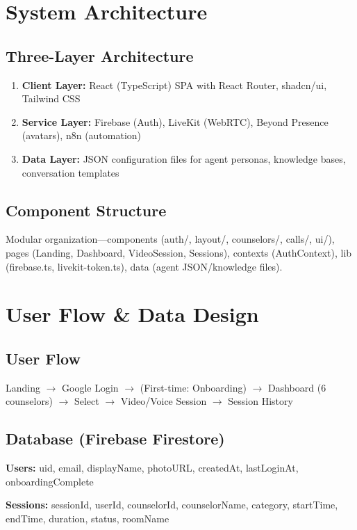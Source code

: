 \documentclass[11pt,a4paper]{report}
\begin{document}
\section{System Architecture}

\subsection{Three-Layer Architecture}
\begin{enumerate}
    \item \textbf{Client Layer:} React (TypeScript) SPA with React Router, shadcn/ui, Tailwind CSS
    \item \textbf{Service Layer:} Firebase (Auth), LiveKit (WebRTC), Beyond Presence (avatars), n8n (automation)
    \item \textbf{Data Layer:} JSON configuration files for agent personas, knowledge bases, conversation templates
\end{enumerate}

\subsection{Component Structure}
Modular organization---components (auth/, layout/, counselors/, calls/, ui/), pages (Landing, Dashboard, VideoSession, Sessions), contexts (AuthContext), lib (firebase.ts, livekit-token.ts), data (agent JSON/knowledge files).

\section{User Flow \& Data Design}

\subsection{User Flow}
Landing $\rightarrow$ Google Login $\rightarrow$ (First-time: Onboarding) $\rightarrow$ Dashboard (6 counselors) $\rightarrow$ Select $\rightarrow$ Video/Voice Session $\rightarrow$ Session History

\subsection{Database (Firebase Firestore)}
\textbf{Users:} uid, email, displayName, photoURL, createdAt, lastLoginAt, onboardingComplete

\textbf{Sessions:} sessionId, userId, counselorId, counselorName, category, startTime, endTime, duration, status, roomName
\end{document}
